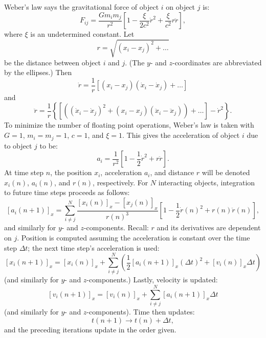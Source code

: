 \documentclass[preview]{standalone}
\begin{document}
Weber's law says the gravitational force of object $i$ on object $j$ is: $$F_{ij}=\frac{Gm_im_j}{r^2}\left[1-\frac{\xi}{2c^2}\dot{r}^2+\frac{\xi}{c^2}r\ddot{r}\right],$$ where $\xi$ is an undetermined constant. Let $$r=\sqrt{(x_i-x_j)^2+\ldots}$$ be the distance between object $i$ and $j$. (The $y$- and $z$-coordinates are abbreviated by the ellipses.) Then $$\dot{r}=\frac{1}{r}\left[(x_i-x_j)(\dot{x}_i-\dot{x}_j)+\ldots\right]$$ and $$\ddot{r}=\frac{1}{r}\left\{\left[\left((\dot{x}_i-\dot{x}_j)^2+(x_i-x_j)(\ddot{x}_i-\ddot{x}_j)\right)+\ldots\right]-\dot{r}^2\right\}.$$ To minimize the number of floating point operations, Weber's law is taken with $G=1$, $m_i=m_j=1$, $c=1$, and $\xi=1$. This gives the acceleration of object $i$ due to object $j$ to be:  $$a_i=\frac{1}{r^2}\left[1-\frac{1}{2}\dot{r}^2+r\ddot{r}\right].$$ At time step $n$, the position $x_i$, acceleration $a_i$, and distance $r$ will be denoted $x_i(n)$, $a_i(n)$, and $r(n)$, respectively. For $N$ interacting objects, integration to future time steps proceeds as follows: $$\left[a_i(n+1)\right]_x=\sum_{i\ne j}^{N}\frac{[x_i(n)]_x-[x_j(n)]_x}{r(n)^3}\left[1-\frac{1}{2}\dot{r}(n)^2+r(n)\ddot{r}(n)\right],$$ and similarly for $y$- and $z$-components. Recall: $r$ and its derivatives are dependent on $j$. Position is computed assuming the acceleration is constant over the time step $\Delta t$; the next time step's acceleration is used: $$[x_i(n+1)]_x=[x_i(n)]_x+\sum_{i\ne j}^{N}\left(\frac{1}{2}[a_i(n+1)]_x(\Delta t)^2+[v_i(n)]_x\Delta t\right)$$ (and similarly for $y$- and $z$-components.) Lastly, velocity is updated:$$[v_i(n+1)]_x=[v_i(n)]_x+\sum_{i\ne j}^{N}[a_i(n+1)]_x\Delta t$$ (and similarly for $y$- and $z$-components). Time then updates:$$t(n+1)\rightarrow t(n)+\Delta t,$$and the preceding iterations update in the order given.
\end{document}
